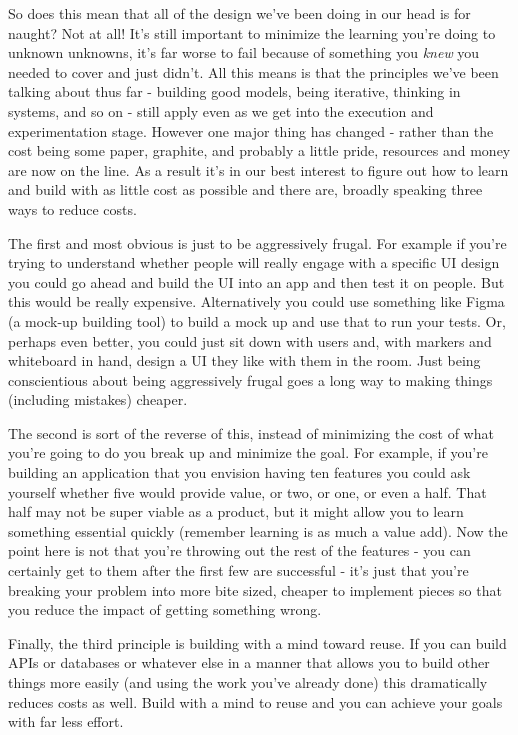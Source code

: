 \documentclass[11pt,a5paper]{book}
\begin{document}
So does this mean that all of the design we've been doing in our head is for naught? Not at all! It's still important to minimize the learning you're doing to unknown unknowns, it's far worse to fail because of something you \textit{knew} you needed to cover and just didn't. All this means is that the principles we've been talking about thus far - building good models, being iterative, thinking in systems, and so on - still apply even as we get into the execution and experimentation stage. However one major thing has changed - rather than the cost being some paper, graphite, and probably a little pride, resources and money are now on the line. As a result it's in our best interest to figure out how to learn and build with as little cost as possible and there are, broadly speaking \cite{macmillan} \cite{patton} three ways to reduce costs. 
\newline

The first and most obvious is just to be aggressively frugal. For example if you're trying to understand whether people will really engage with a specific UI design you could go ahead and build the UI into an app and then test it on people. But this would be really expensive. Alternatively you could use something like Figma (a mock-up building tool) to build a mock up and use that to run your tests. Or, perhaps even better, you could just sit down with users and, with markers and whiteboard in hand, design a UI they like with them in the room. Just being conscientious about being aggressively frugal goes a long way to making things (including mistakes) cheaper.
\newline

The second is sort of the reverse of this, instead of minimizing the cost of what you're going to do you break up and minimize the goal. For example, if you're building an application that you envision having ten features you could ask yourself whether five would provide value, or two, or one, or even a half. That half may not be super viable as a product, but it might allow you to learn something essential quickly (remember learning is as much a value add). Now the point here is not that you're throwing out the rest of the features - you can certainly get to them after the first few are successful - it's just that you're breaking your problem into more bite sized, cheaper to implement pieces so that you reduce the impact of getting something wrong. 
\newline

Finally, the third principle is building with a mind toward reuse. If you can build APIs or databases or whatever else in a manner that allows you to build other things more easily (and using the work you've already done) this dramatically reduces costs as well. Build with a mind to reuse and you can achieve your goals with far less effort.
\newline
\end{document}
